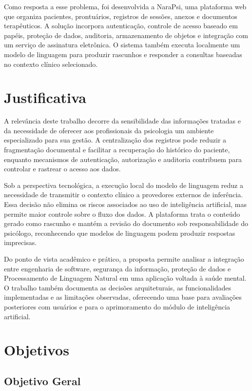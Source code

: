 Como resposta a esse problema, foi desenvolvida a NaraPsi, uma plataforma web que organiza pacientes, prontuários, registros de sessões, anexos e documentos terapêuticos. A solução incorpora autenticação, controle de acesso baseado em papéis, proteção de dados, auditoria, armazenamento de objetos e integração com um serviço de assinatura eletrônica. O sistema também executa localmente um modelo de linguagem para produzir rascunhos e responder a consultas baseadas no contexto clínico selecionado.

\section{Justificativa}

A relevância deste trabalho decorre da sensibilidade das informações tratadas e da necessidade de oferecer aos profissionais da psicologia um ambiente especializado para sua gestão. A centralização dos registros pode reduzir a fragmentação documental e facilitar a recuperação do histórico do paciente, enquanto mecanismos de autenticação, autorização e auditoria contribuem para controlar e rastrear o acesso aos dados.

Sob a perspectiva tecnológica, a execução local do modelo de linguagem reduz a necessidade de transmitir o contexto clínico a provedores externos de inferência. Essa decisão não elimina os riscos associados ao uso de inteligência artificial, mas permite maior controle sobre o fluxo dos dados. A plataforma trata o conteúdo gerado como rascunho e mantém a revisão do documento sob responsabilidade do psicólogo, reconhecendo que modelos de linguagem podem produzir respostas imprecisas.

Do ponto de vista acadêmico e prático, a proposta permite analisar a integração entre engenharia de software, segurança da informação, proteção de dados e Processamento de Linguagem Natural em uma aplicação voltada à saúde mental. O trabalho também documenta as decisões arquiteturais, as funcionalidades implementadas e as limitações observadas, oferecendo uma base para avaliações posteriores com usuários e para o aprimoramento do módulo de inteligência artificial.

\section{Objetivos}

\subsection{Objetivo Geral}

